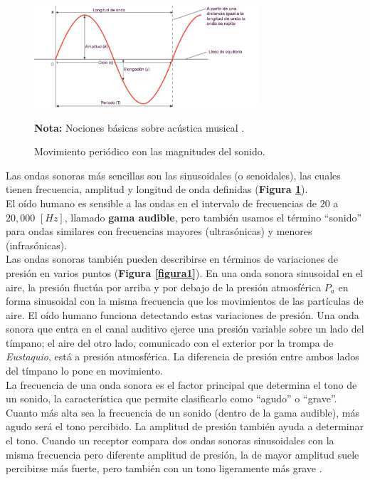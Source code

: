 \documentclass[letter,11pt]{article}
\newcommand{\source}[1]{\vspace{-11pt} \caption*{\small{\textbf{Nota:} {#1}}}}
\begin{document}
\begin{figure}
\centering
\includegraphics[width=0.75\textwidth]{resources/f2.eps}
\caption{Movimiento periódico con las magnitudes del sonido.}
\label{figura2}
\source{Nociones básicas sobre acústica musical \cite{MIGUELMORATEORGANOLOGIA}.}
\end{figure}

Las ondas sonoras más sencillas son las sinusoidales (o senoidales), las cuales
tienen frecuencia, amplitud y longitud de onda definidas
(\textbf{Figura \ref{figura2}}).
\\

El oído humano es sensible a las ondas en el intervalo de frecuencias de $20$ a
$20,000$ $[Hz]$, llamado \textbf{gama audible}, pero también usamos el término
``sonido'' para ondas similares con frecuencias mayores (ultrasónicas) y menores
(infrasónicas).
\\

Las ondas sonoras también pueden describirse en términos de variaciones de
presión en varios puntos (\textbf{Figura \ref{figura1}}). En una onda sonora
sinusoidal en el aire, la presión fluctúa por arriba y por debajo de la presión
atmosférica $P_a$ en forma sinusoidal con la misma frecuencia que los
movimientos de las partículas de aire. El oído humano funciona detectando estas
variaciones de presión. Una onda sonora que entra en el canal auditivo ejerce
una presión variable sobre un lado del tímpano; el aire del otro lado,
comunicado con el exterior por la trompa de \emph{Eustaquio}, está a presión
atmosférica. La diferencia de presión entre ambos lados del tímpano lo pone en
movimiento.
\\

La frecuencia de una onda sonora es el factor principal que determina el tono de
un sonido, la característica que permite clasificarlo como ``agudo'' o
``grave''. Cuanto más alta sea la frecuencia de un sonido (dentro de la gama
audible), más agudo será el tono percibido. La amplitud de presión también ayuda
a determinar el tono. Cuando un receptor compara dos ondas sonoras sinusoidales
con la misma frecuencia pero diferente amplitud de presión, la de mayor amplitud
suele percibirse más fuerte, pero también con un tono ligeramente más grave
\cite{Young&Freedman}.
\end{document}
